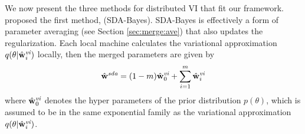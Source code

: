 \documentclass[thesis.tex]{subfiles}
\newcommand{\q}[1]{q\left({#1}\right)}
\newcommand{\qi}[1]{q^{(i)}\left({#1}\right)}
\newcommand{\p}[1]{p\left({#1}\right)}
\newcommand{\wvi}{\hat\w^\textit{vi}}
\newcommand{\wsda}{\hat\w^\textit{sda}}
\newcommand{\ELBO}{\text{ELBO}}
\begin{document}

We now present the three methods for distributed VI that fit our framework.
\citet{broderick2013streaming} proposed the first method, 
 (SDA-Bayes). 
SDA-Bayes is effectively a form of parameter averaging (see Section \ref{sec:merge:ave}) that also updates the regularization. 
Each local machine calculates the variational approximation $q(\theta|\wvi_i)$ locally,
then the merged parameters are given by
\begin{equation}
    \wsda = (1-m)\wvi_0+\sum_{i=1}^m\wvi_i
\end{equation}
where $\wvi_0$ denotes the hyper parameters of the prior distribution $p(\theta)$,
which is assumed to be in the same exponential family as the variational approximation $q(\theta|\wvi_i)$.
\end{document}
